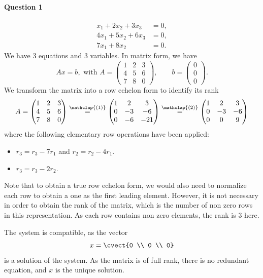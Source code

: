 
\paragraph*{Question 1}
\begin{align*}
x_1+2x_2+3x_3 & = 0,\\
4x_1+5x_2+6x_3 & = 0,\\
7x_1+8x_2& =0.
\end{align*}
We have 3 equations and 3 variables. In matrix form, we have
\[
Ax = b, \text{ with } A= \begin{pmatrix}
1&2&3\\ 4&5&6\\ 7&8&0
\end{pmatrix}, \qquad b = \begin{pmatrix}
0\\0\\0
\end{pmatrix}.
\]
We transform the matrix into a row echelon form to identify its rank
\[
A=
\begin{pmatrix}
  1 & 2 & 3 \\ 4 & 5 & 6 \\ 7 & 8 & 0 
\end{pmatrix}
\stackrel{\mathclap{(1)}}{=}
\begin{pmatrix}
  1 & 2 & 3 \\ 0 & -3 & -6 \\ 0 & -6 & -21 
\end{pmatrix}
\stackrel{\mathclap{(2)}}{=}
\begin{pmatrix}
  1 & 2 & 3 \\ 0 & -3 & -6 \\ 0 & 0 & 9 
\end{pmatrix}
\]
where the following elementary row operations have been applied:
\begin{itemize}
\item[(1)] $r_3 = r_3 - 7r_1$ and $r_2=r_2-4r_1$.
\item[(2)] $r_3 = r_3 -2 r_2$.
\end{itemize}
Note that to obtain a true row echelon form, we would also need to normalize
each row to obtain a one as the first leading element. However, it is
not necessary in order to obtain the rank of the matrix, which is the number of
non zero rows in this representation. As each row contains non
zero elements, the rank is 3 here.

The system is compatible, as the vector
\[
x=\cvect{0 \\ 0 \\ 0}
\]
is a solution of the system. As the matrix is of full rank, there is
no redundant equation, and $x$ is the unique solution.



